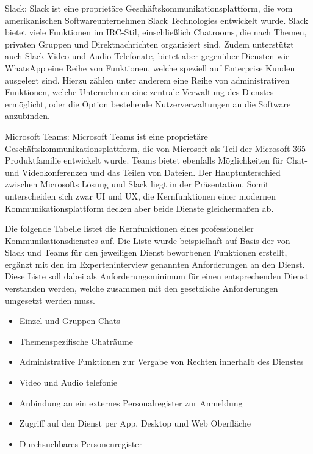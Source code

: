 Slack: Slack ist eine proprietäre Geschäftskommunikationsplattform, die vom amerikanischen Softwareunternehmen Slack Technologies entwickelt wurde. Slack bietet viele Funktionen im IRC-Stil, einschließlich Chatrooms, die nach Themen, privaten Gruppen und Direktnachrichten organisiert sind. Zudem unterstützt auch Slack Video und Audio Telefonate, bietet aber gegenüber Diensten wie WhatsApp eine Reihe von Funktionen, welche speziell auf Enterprise Kunden ausgelegt sind. Hierzu zählen unter anderem eine Reihe von administrativen Funktionen, welche Unternehmen eine zentrale Verwaltung des Dienstes ermöglicht, oder die Option bestehende Nutzerverwaltungen an die Software anzubinden.

Microsoft Teams: Microsoft Teams ist eine proprietäre Geschäftskommunikationsplattform, die von Microsoft als Teil der Microsoft 365-Produktfamilie entwickelt wurde. Teams bietet ebenfalls Möglichkeiten für Chat- und Videokonferenzen und das Teilen von Dateien. Der Hauptunterschied zwischen Microsofts Lösung und Slack liegt in der Präsentation. Somit unterscheiden sich zwar UI und UX, die Kernfunktionen einer modernen Kommunikationsplattform decken aber beide Dienste gleichermaßen ab.

Die folgende Tabelle listet die Kernfunktionen eines professioneller Kommunikationsdienstes auf. Die Liste wurde beispielhaft auf Basis der von Slack und Teams für den jeweiligen Dienst beworbenen Funktionen erstellt, ergänzt mit den im Experteninterview genannten Anforderungen an den Dienst. Diese Liste soll dabei als Anforderungsminimum für einen entsprechenden Dienst verstanden werden, welche zusammen mit den gesetzliche Anforderungen umgesetzt werden muss.

\begin{itemize}
    \item Einzel und Gruppen Chats 
    \item Themenspezifische Chaträume
    \item Administrative Funktionen zur Vergabe von Rechten innerhalb des Dienstes 
    \item Video und Audio telefonie
    \item Anbindung an ein externes Personalregister zur Anmeldung
    \item Zugriff auf den Dienst per App, Desktop und Web Oberfläche
    \item Durchsuchbares Personenregister
\end{itemize}